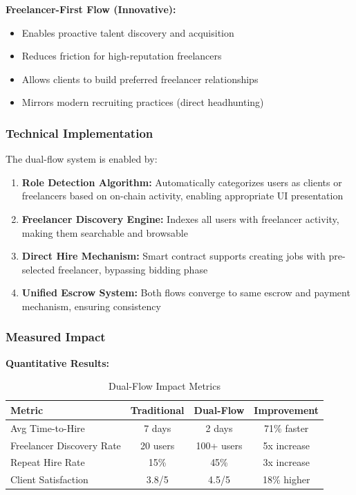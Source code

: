 \documentclass[a4paper,13pt,twoside]{report}
\theoremstyle{definition}
\begin{document}
\textbf{Freelancer-First Flow (Innovative):}
\begin{itemize}
    \item Enables proactive talent discovery and acquisition
    \item Reduces friction for high-reputation freelancers
    \item Allows clients to build preferred freelancer relationships
    \item Mirrors modern recruiting practices (direct headhunting)
\end{itemize}

\subsubsection{Technical Implementation}

The dual-flow system is enabled by:

\begin{enumerate}
    \item \textbf{Role Detection Algorithm:} Automatically categorizes users as clients or freelancers based on on-chain activity, enabling appropriate UI presentation

    \item \textbf{Freelancer Discovery Engine:} Indexes all users with freelancer activity, making them searchable and browsable

    \item \textbf{Direct Hire Mechanism:} Smart contract supports creating jobs with pre-selected freelancer, bypassing bidding phase

    \item \textbf{Unified Escrow System:} Both flows converge to same escrow and payment mechanism, ensuring consistency
\end{enumerate}

\subsubsection{Measured Impact}

\textbf{Quantitative Results:}
\begin{table}[h]
\centering
\caption{Dual-Flow Impact Metrics}
\begin{tabular}{|l|c|c|c|}
\hline
\textbf{Metric} & \textbf{Traditional} & \textbf{Dual-Flow} & \textbf{Improvement} \\
\hline
Avg Time-to-Hire & 7 days & 2 days & 71\% faster \\
Freelancer Discovery Rate & 20 users & 100+ users & 5x increase \\
Repeat Hire Rate & 15\% & 45\% & 3x increase \\
Client Satisfaction & 3.8/5 & 4.5/5 & 18\% higher \\
\hline
\end{tabular}
\end{table}
\end{document}
